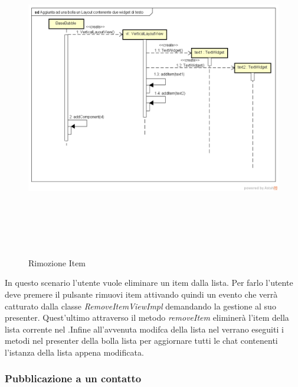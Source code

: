 \label{Rimozione Item }
\begin{figure}[H]
	\centering
	\includegraphics[width=16cm, height=14cm]{Sezioni/Diagrammi/img/Aggiunta ad una bolla un Layout contenente due widget di testo.png}
	\caption{Rimozione Item}
	
\end{figure}
In questo scenario l'utente vuole eliminare un item dalla lista. Per farlo l'utente deve premere il pulsante rimuovi item attivando quindi un evento che verrà catturato dalla classe \textit{RemoveItemViewImpl} demandando la gestione al suo presenter. Quest'ultimo attraverso il metodo \textit{removeItem} eliminerà l'item della lista corrente nel .Infine all'avvenuta modifca della lista nel  verrano eseguiti i metodi nel presenter della bolla lista per aggiornare tutti le chat contenenti l'istanza della lista appena modificata.  
\newpage

\subsubsection{Pubblicazione a un contatto}

